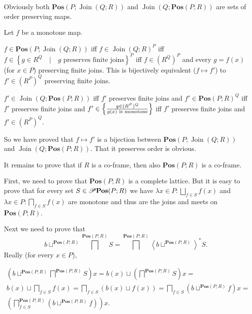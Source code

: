 Obviously both $\mathbf{Pos}(P;\operatorname{Join}(Q;R))$ and $\operatorname{Join}\left(Q;\mathbf{Pos}(P;R)\right)$
are sets of order preserving maps.

Let $f$ be a monotone map.

$f\in\mathbf{Pos}(P;\operatorname{Join}(Q;R))$ iff $f\in\operatorname{Join}(Q;R)^{P}$
iff $f\in\left\{ g\in R^{Q}\hspace{1em}|\hspace{1em}g\text{ preserves finite joins}\right\} ^{P}$
iff $f\in(R^{Q})^{P}$ and every $g=f(x)$ (for $x\in P$) preserving
finite joins. This is bijectively equivalent ($f\mapsto f'$) to $f'\in(R^{P})^{Q}$
preserving finite joins.

$f'\in\operatorname{Join}\left(Q;\mathbf{Pos}(P;R)\right)$ iff $f'$
preserves finite joins and $f'\in\mathbf{Pos}(P;R)^{Q}$ iff $f'$
preserves finite joins and $f'\in\left\{ \frac{g\in(R^{P})^{Q}}{g(x)\text{ is monotone}}\right\}$
iff $f'$ preserves finite joins and $f'\in(R^{P})^{Q}$.

So we have proved that $f\mapsto f'$ is a bijection between $\mathbf{Pos}(P;\operatorname{Join}(Q;R))$
and $\operatorname{Join}\left(Q;\mathbf{Pos}(P;R)\right)$. That it
preserves order is obvious.

It remains to prove that if $R$ is a co-frame, then also $\mathbf{Pos}(P;R)$
is a co-frame.

First, we need to prove that $\mathbf{Pos}(P;R)$ is a complete lattice.
But it is easy to prove that for every set $S\in\mathscr{P}\mathbf{Pos}(P;R)$
we have $\lambda x\in P:\bigsqcup_{f\in S}f(x)$ and $\lambda x\in P:\bigsqcap_{f\in S}f(x)$
are monotone and thus are the joins and meets on $\mathbf{Pos}(P;R)$.

Next we need to prove that 
\[
b\sqcup^{\mathbf{Pos}(P;R)}\bigsqcap^{\mathbf{Pos}(P;R)}S=\bigsqcap^{\mathbf{Pos}(P;R)}\left\langle b\sqcup^{\mathbf{Pos}(P;R)}\right\rangle ^{\ast}S.
\]
Really (for every $x\in P$),

\begin{multline*}
\left(b\sqcup^{\mathbf{Pos}(P;R)}\bigsqcap^{\mathbf{Pos}(P;R)}S\right)x=b(x)\sqcup\left(\bigsqcap^{\mathbf{Pos}(P;R)}S\right)x=\\
b(x)\sqcup\bigsqcap_{f\in S}f(x)=\bigsqcap_{f\in S}(b(x)\sqcup f(x))=\bigsqcap_{f\in S}\left(b\sqcup^{\mathbf{Pos}(P;R)}f\right)x=\\
\left(\bigsqcap_{f\in S}^{\mathbf{Pos}(P;R)}\left(b\sqcup^{\mathbf{Pos}(P;R)}f\right)\right)x.
\end{multline*}


